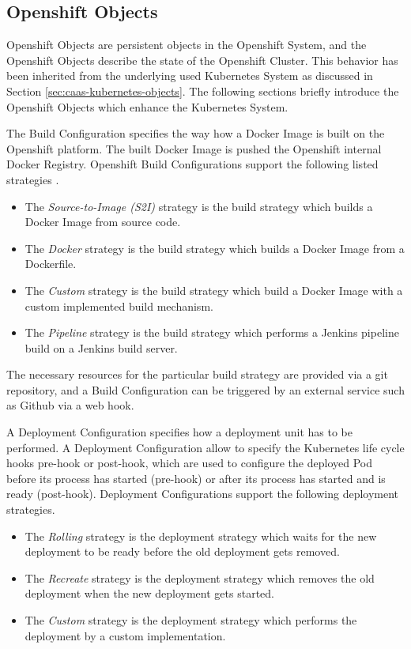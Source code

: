 \subsection{Openshift Objects}
\label{sec:paas-openshift-objects}
Openshift Objects are persistent objects in the Openshift System, and the Openshift Objects describe the state of the Openshift Cluster. This behavior has been inherited from the underlying used Kubernetes System as discussed in Section \vref{sec:caas-kubernetes-objects}. The following sections briefly introduce the Openshift Objects which enhance the Kubernetes System. 

The Build Configuration specifies the way how a Docker Image is built on the Openshift platform. The built Docker Image is pushed the Openshift internal Docker Registry. Openshift Build Configurations support the following listed strategies \cite{OpenshiftBuildAndImageStreams2018, S2I2018}.
\begin{itemize}
	\item The \emph{Source-to-Image (S2I)} strategy is the build strategy which builds a Docker Image from source code.
	\item The \emph{Docker} strategy is the build strategy which builds a Docker Image from a Dockerfile.
	\item The \emph{Custom} strategy is the build strategy which build a Docker Image with a custom implemented build mechanism.
	\item The \emph{Pipeline} strategy is the build strategy which performs a Jenkins pipeline build on a Jenkins build server.
\end{itemize}
The necessary resources for the particular build strategy are provided via a git repository, and a Build Configuration can be triggered by an external service such as Github via a web hook. 

A Deployment Configuration specifies how a deployment unit has to be performed. A Deployment Configuration allow to specify the Kubernetes life cycle hooks pre-hook or post-hook, which are used to configure the deployed Pod before its process has started (pre-hook) or after its process has started and is ready (post-hook). Deployment Configurations support the following deployment strategies.
\begin{itemize}
	\item The \emph{Rolling} strategy is the deployment strategy which waits for the new deployment to be ready before the old deployment gets removed.
	\item The \emph{Recreate} strategy is the deployment strategy which removes the old deployment when the new deployment gets started.
	\item The \emph{Custom} strategy is the deployment strategy which performs the deployment by a custom implementation.
\end{itemize}


